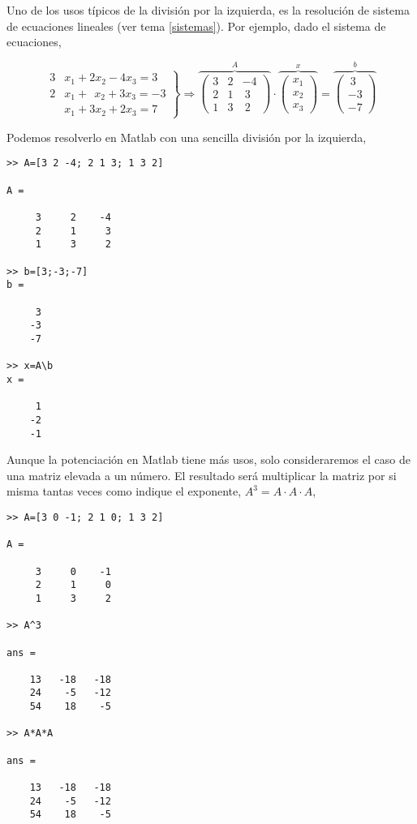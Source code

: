 Uno de los usos típicos de la división por la izquierda, es la resolución de sistema de ecuaciones lineales (ver tema \ref{sistemas}). Por ejemplo, dado el sistema de ecuaciones,

\begin{equation*}
\left. \begin{aligned}
3&x_1+2x_2-4x_3=3\\
2&x_1+ \ \ x_2+3x_3=-3\\
&x_1+3x_2+2x_3=7
\end{aligned}\right\} \Rightarrow	\overbrace{\begin{pmatrix}
3& 2& -4\\
2& 1& \ 3\\
1& 3& \ 2
\end{pmatrix}}^A \cdot \overbrace{\begin{pmatrix}
x_1\\
x_2\\
x_3
\end{pmatrix}}^x=\overbrace{\begin{pmatrix}
 \ 3\\
-3\\
-7
\end{pmatrix}}^b
\end{equation*}

Podemos resolverlo en Matlab con una sencilla división por la izquierda,

\begin{verbatim}
>> A=[3 2 -4; 2 1 3; 1 3 2]

A =

     3     2    -4
     2     1     3
     1     3     2

>> b=[3;-3;-7]
b =

     3
    -3
    -7

>> x=A\b
x =

     1
    -2
    -1
\end{verbatim}
Aunque la potenciación en Matlab tiene más usos, solo consideraremos el caso de una matriz elevada a un número. El resultado será multiplicar la matriz por si misma tantas veces como indique el exponente, $A^3=A\cdot A \cdot A$,
\begin{verbatim}
>> A=[3 0 -1; 2 1 0; 1 3 2]

A =

     3     0    -1
     2     1     0
     1     3     2

>> A^3

ans =

    13   -18   -18
    24    -5   -12
    54    18    -5

>> A*A*A

ans =

    13   -18   -18
    24    -5   -12
    54    18    -5

\end{verbatim}

